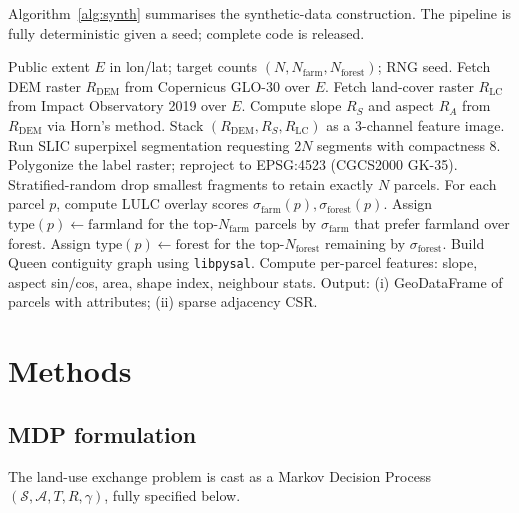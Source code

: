 \documentclass[]{interact}
\theoremstyle{plain}
\begin{document}
Algorithm~\ref{alg:synth} summarises the synthetic-data construction. The pipeline is fully deterministic given a seed; complete code is released.

\begin{algorithm}[htbp]
\caption{Synthetic cadastral data construction.}
\label{alg:synth}
\begin{algorithmic}[1]
\REQUIRE Public extent $E$ in lon/lat; target counts $(N, N_\text{farm}, N_\text{forest})$; RNG seed.
\STATE Fetch DEM raster $R_\text{DEM}$ from Copernicus GLO-30 over $E$.
\STATE Fetch land-cover raster $R_\text{LC}$ from Impact Observatory 2019 over $E$.
\STATE Compute slope $R_S$ and aspect $R_A$ from $R_\text{DEM}$ via Horn's method.
\STATE Stack $(R_\text{DEM}, R_S, R_\text{LC})$ as a 3-channel feature image.
\STATE Run SLIC superpixel segmentation requesting $2N$ segments with compactness 8.
\STATE Polygonize the label raster; reproject to EPSG:4523 (CGCS2000 GK-35).
\STATE Stratified-random drop smallest fragments to retain exactly $N$ parcels.
\STATE For each parcel $p$, compute LULC overlay scores $\sigma_\text{farm}(p), \sigma_\text{forest}(p)$.
\STATE Assign $\text{type}(p) \leftarrow \text{farmland}$ for the top-$N_\text{farm}$ parcels by $\sigma_\text{farm}$ that prefer farmland over forest.
\STATE Assign $\text{type}(p) \leftarrow \text{forest}$ for the top-$N_\text{forest}$ remaining by $\sigma_\text{forest}$.
\STATE Build Queen contiguity graph using \texttt{libpysal}.
\STATE Compute per-parcel features: slope, aspect sin/cos, area, shape index, neighbour stats.
\STATE Output: (i) GeoDataFrame of parcels with attributes; (ii) sparse adjacency CSR.
\end{algorithmic}
\end{algorithm}

\section{Methods}\label{sec:methods}

\subsection{MDP formulation}

The land-use exchange problem is cast as a Markov Decision Process $(\mathcal{S}, \mathcal{A}, T, R, \gamma)$, fully specified below.
\end{document}
